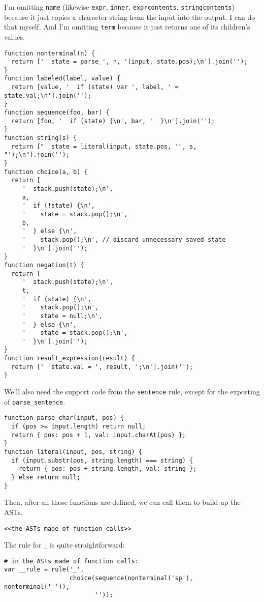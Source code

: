 \documentclass[
]{article}
\begin{document}
I'm omitting \texttt{name} (likewise \texttt{expr}, \texttt{inner},
\texttt{exprcontents}, \texttt{stringcontents}) because it just copies a
character string from the input into the output. I can do that myself.
And I'm omitting \texttt{term} because it just returns one of its
children's values.

\begin{verbatim}
function nonterminal(n) {
  return ['  state = parse_', n, '(input, state.pos);\n'].join('');
}
function labeled(label, value) {
  return [value, '  if (state) var ', label, ' = state.val;\n'].join('');
}
function sequence(foo, bar) {
  return [foo, '  if (state) {\n', bar, '  }\n'].join('');
}
function string(s) {
  return ["  state = literal(input, state.pos, '", s, "');\n"].join('');
}
function choice(a, b) {
  return [
     '  stack.push(state);\n',
     a,
     '  if (!state) {\n',
     '    state = stack.pop();\n',
     b,
     '  } else {\n',
     '    stack.pop();\n', // discard unnecessary saved state
     '  }\n'].join('');
}
function negation(t) {
  return [
     '  stack.push(state);\n',
     t,
     '  if (state) {\n',
     '    stack.pop();\n',
     '    state = null;\n',
     '  } else {\n',
     '    state = stack.pop();\n',
     '  }\n'].join('');
}
function result_expression(result) {
  return ['  state.val = ', result, ';\n'].join('');
}
\end{verbatim}

We'll also need the support code from the \texttt{sentence} rule, except
for the exporting of \texttt{parse\_sentence}.

\begin{verbatim}
function parse_char(input, pos) {
  if (pos >= input.length) return null;
  return { pos: pos + 1, val: input.charAt(pos) };
}
function literal(input, pos, string) {
  if (input.substr(pos, string.length) === string) {
    return { pos: pos + string.length, val: string };
  } else return null;
}
\end{verbatim}

Then, after all those functions are defined, we can call them to build
up the ASTs.

\begin{verbatim}
<<the ASTs made of function calls>>
\end{verbatim}

The rule for \texttt{\_} is quite straightforward:

\begin{verbatim}
# in the ASTs made of function calls:
var __rule = rule('_',
                  choice(sequence(nonterminal('sp'), nonterminal('_')), 
                         ''));
\end{verbatim}
\end{document}
